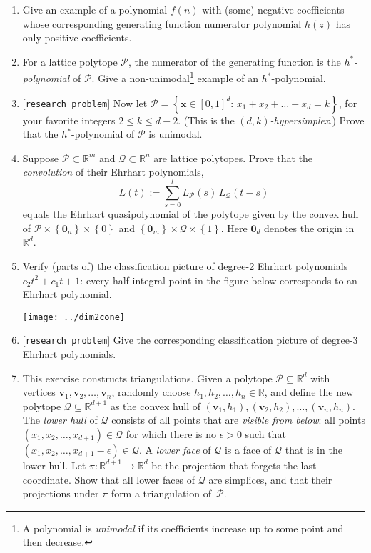 \documentclass[11pt]{article}
\def\bv{\mathbf{v}}
\def\bx{\mathbf{x}}
\def\0{\mathbf{0}}
\def\cP{\mathcal{P}}
\def\cQ{\mathcal{Q}}
\def\RR{\mathbb{R}}
\def\open{$[${\tt research problem}$]$ }
\begin{document}
\begin{enumerate}[(1)]
\item Give an example of a polynomial $f(n)$ with (some) negative coefficients whose corresponding generating function
numerator polynomial $h(z)$ has only positive coefficients.

\item For a lattice polytope $\cP$, the numerator of the generating function is the \emph{$h^*$-polynomial} of $\cP$.
Give a non-unimodal\footnote{
A polynomial is \emph{unimodal} if its coefficients increase up to some point and
then decrease.
} example of an $h^*$-polynomial.

\item \open
Now let
$\cP = \left\{ \bx \in [0,1]^d : \, x_1 + x_2 + \dots + x_d = k \right\}$,
for your favorite integers $2 \le k \le d-2$. 
(This is the \emph{$(d, k)$-hypersimplex}.)
Prove that the $h^*$-polynomial of $\cP$ is unimodal.

\item Suppose $\cP \subset \RR^m$ and $\cQ \subset \RR^n$ are lattice polytopes.
Prove that the \emph{convolution} of their Ehrhart polynomials,
\[
  L(t) := \sum_{ s=0 }^t L_\cP(s) \, L_\cQ(t-s)
\]
equals the Ehrhart quasipolynomial of the polytope given by the convex hull of $\cP
\times \left\{ \0_n \right\} \times \left\{ 0 \right\}$ and $\left\{ \0_m \right\}
\times \cQ \times \left\{ 1 \right\} $. Here $\0_d$ denotes the origin in $\RR^d$.

\item Verify (parts of) the classification picture of degree-2 Ehrhart polynomials $c_2 t^2 + c_1 t + 1$: every
half-integral point in the figure below corresponds to an Ehrhart polynomial.

\begin{center}
\texttt{[image: ../dim2cone]}
\end{center}

\item \open Give the corresponding classification picture of degree-3 Ehrhart polynomials. 
 

\item This exercise constructs triangulations.
Given a polytope $\cP \subseteq \RR^d$ with vertices $\bv_1, \bv_2, \dots, \bv_n$, randomly choose $h_1, h_2,
\dots, h_n \in \RR$, and define the new polytope $\cQ \subseteq \RR^{ d+1 }$ as the convex hull of
$(\bv_1, h_1), (\bv_2, h_2), \dots, (\bv_n, h_n)$.
The \emph{lower hull} of $\cQ$ consists of all points that are \emph{visible from below}: all points $(x_1, x_2, \dots, x_{ d+1 }) \in \cQ$ for which there is no $\epsilon > 0$ such that $(x_1, x_2, \dots, x_{ d+1 } - \epsilon) \in \cQ$.
A \emph{lower face} of $\cQ$ is a face of $\cQ$ that is in the lower hull.
Let $\pi : \RR^{ d+1 } \to \RR^d$ be the projection that forgets the last coordinate. 
Show that all lower faces of $\cQ$ are simplices, and that their projections under $\pi$ form a triangulation of~$\cP$.

\end{enumerate}
\end{document}
